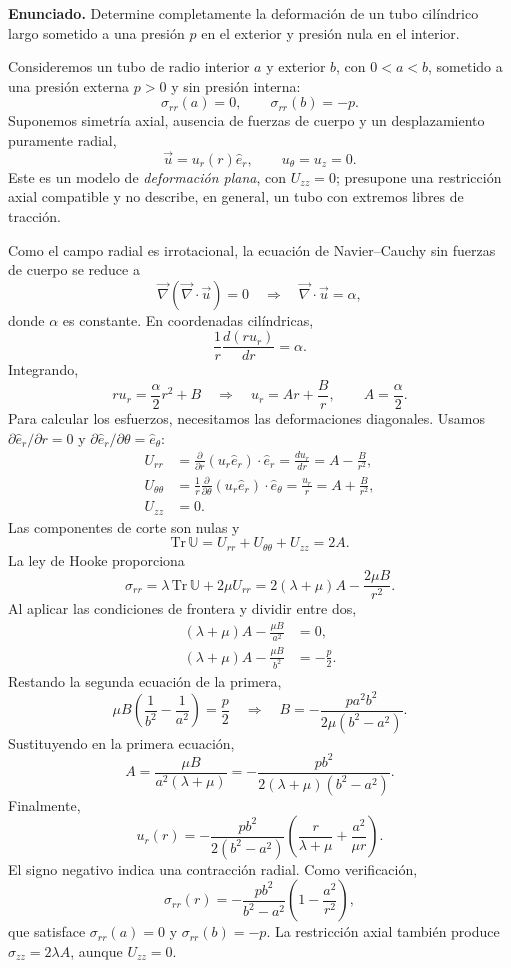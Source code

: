 \textbf{Enunciado.} Determine completamente la deformación de un tubo cilíndrico largo sometido a una presión $p$ en el exterior y presión nula en el interior.

Consideremos un tubo de radio interior $a$ y exterior $b$, con $0<a<b$, sometido a una presión externa $p>0$ y sin presión interna:
\[
\sigma_{rr}(a)=0,
\qquad \sigma_{rr}(b)=-p.
\]
Suponemos simetría axial, ausencia de fuerzas de cuerpo y un desplazamiento puramente radial,
\[
\vec u=u_r(r)\hat e_r,
\qquad u_\theta=u_z=0.
\]
Este es un modelo de \emph{deformación plana}, con $U_{zz}=0$; presupone una restricción axial compatible y no describe, en general, un tubo con extremos libres de tracción.

Como el campo radial es irrotacional, la ecuación de Navier--Cauchy sin fuerzas de cuerpo se reduce a
\[
\vec\nabla(\vec\nabla\cdot\vec u)=0
\quad\Longrightarrow\quad
\vec\nabla\cdot\vec u=\alpha,
\]
donde $\alpha$ es constante. En coordenadas cilíndricas,
\[
\frac{1}{r}\frac{d(ru_r)}{dr}=\alpha.
\]
Integrando,
\[
ru_r=\frac{\alpha}{2}r^2+B
\quad\Longrightarrow\quad
u_r=Ar+\frac{B}{r},
\qquad A=\frac{\alpha}{2}.
\]
Para calcular los esfuerzos, necesitamos las deformaciones diagonales. Usamos $\partial\hat e_r/\partial r=0$ y $\partial\hat e_r/\partial\theta=\hat e_\theta$:
\[
\begin{aligned}
U_{rr}
&=\frac{\partial}{\partial r}(u_r\hat e_r)\cdot\hat e_r
=\frac{du_r}{dr}=A-\frac{B}{r^2},\\
U_{\theta\theta}
&=\frac{1}{r}\frac{\partial}{\partial\theta}(u_r\hat e_r)\cdot\hat e_\theta
=\frac{u_r}{r}=A+\frac{B}{r^2},\\
U_{zz}&=0.
\end{aligned}
\]
Las componentes de corte son nulas y
\[
\mathrm{Tr}\,\mathbb U=U_{rr}+U_{\theta\theta}+U_{zz}=2A.
\]
La ley de Hooke proporciona
\[
\sigma_{rr}=\lambda\,\mathrm{Tr}\,\mathbb U+2\mu U_{rr}
=2(\lambda+\mu)A-\frac{2\mu B}{r^2}.
\]
Al aplicar las condiciones de frontera y dividir entre dos,
\[
\begin{aligned}
(\lambda+\mu)A-\frac{\mu B}{a^2}&=0,\\
(\lambda+\mu)A-\frac{\mu B}{b^2}&=-\frac{p}{2}.
\end{aligned}
\]
Restando la segunda ecuación de la primera,
\[
\mu B\left(\frac{1}{b^2}-\frac{1}{a^2}\right)=\frac{p}{2}
\quad\Longrightarrow\quad
B=-\frac{pa^2b^2}{2\mu(b^2-a^2)}.
\]
Sustituyendo en la primera ecuación,
\[
A=\frac{\mu B}{a^2(\lambda+\mu)}
=-\frac{pb^2}{2(\lambda+\mu)(b^2-a^2)}.
\]
Finalmente,
\[
\boxed{u_r(r)=-\frac{pb^2}{2(b^2-a^2)}
\left(\frac{r}{\lambda+\mu}+\frac{a^2}{\mu r}\right)}.
\]
El signo negativo indica una contracción radial. Como verificación,
\[
\sigma_{rr}(r)=-\frac{pb^2}{b^2-a^2}
\left(1-\frac{a^2}{r^2}\right),
\]
que satisface $\sigma_{rr}(a)=0$ y $\sigma_{rr}(b)=-p$. La restricción axial también produce $\sigma_{zz}=2\lambda A$, aunque $U_{zz}=0$.



